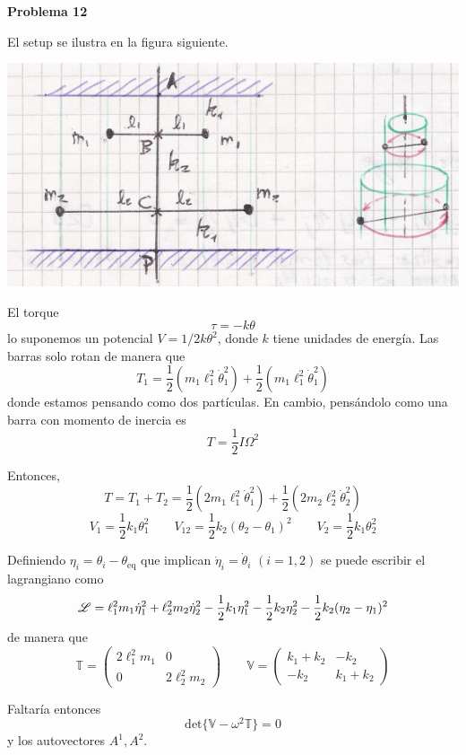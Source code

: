 \documentclass[10pt,oneside]{CBFT_book}
\begin{document}
\begin{ejemplo}{\bf Problema 12}

El setup se ilustra en la figura siguiente.

\includegraphics[scale=0.5]{images/fig_mc_problema_12.jpg}

El torque 
\[
	\tau = - k \theta
\]
lo suponemos un potencial $ V = 1/2 k \theta^2 $, donde $k$ tiene unidades de energía.
Las barras solo rotan de manera que 
\[
	T_1 = \frac{1}{2} ( m_1 \ell_1^2 \dot{\theta}_1^2  ) + \frac{1}{2}( m_1 \ell_1^2 \dot{\theta}^2_1 )
\]
donde estamos pensando como dos partículas. En cambio, pensándolo como una barra con momento de inercia es
\[
	T = \frac{1}{2} I \Omega^2
\]

Entonces,
\[
	T = T_1 + T_2 = \frac{1}{2} ( 2 m_1 \ell_1^2 \dot{\theta}_1^2  ) + \frac{1}{2}( 2 m_2 \ell_2^2 \dot{\theta}^2_2 )
\]
\[
	V_1 = \frac{1}{2} k_1 \theta^2_1 \qquad 
	V_{12} = \frac{1}{2} k_2 ( \theta_2 - \theta_1 )^2  \qquad 
	V_2 = \frac{1}{2} k_1 \theta^2_2 
\]

Definiendo $\eta_i = \theta_i - \theta_{\mbox{eq}}$ que implican $\dot{\eta}_i = \dot{\theta}_i $ $(i=1,2)$ se puede escribir el lagrangiano como 
\[
	\mathscr{L} = \ell_1^2 m_1 \dot{\eta}_1^2 + \ell_2^2 m_2 \dot{\eta}_2^2 - \frac{1}{2} k_1 \eta_1^2 - \frac{1}{2} k_2 \eta_2^2 - \frac{1}{2} k_2 (\eta_2 - \eta_1)^2
\]
de manera que 
\[
	\mathbb{T} = \begin{pmatrix}
	 2 \ell^2_1 m_1 & 0 \\
	 0 & 2 \ell^2_2 m_2 
	\end{pmatrix}
	\qquad 
	\mathbb{V} = \begin{pmatrix}
	 k_1 + k_2 & - k_2 \\
	 -k_2  & k_1 + k_ 2 
	\end{pmatrix}
\]

Faltaría entonces
\[
	\mbox{det} \{ \mathbb{V} - \omega^2 \mathbb{T} \} = 0
\]
y los autovectores $A^1, A^2$.


\end{ejemplo}
\end{document}
